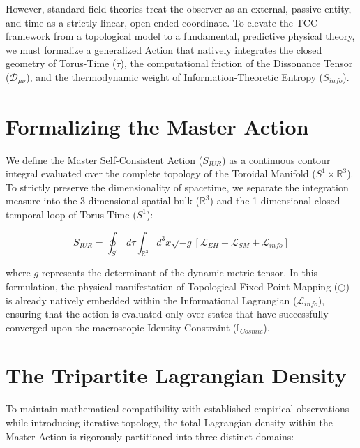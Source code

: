 \documentclass[12pt,openany]{book}
\theoremstyle{plain}
\theoremstyle{definition}
\theoremstyle{remark}
\begin{document}
However, standard field theories treat the observer as an external, passive entity, and time as a strictly linear, open-ended coordinate. To elevate the TCC framework from a topological model to a fundamental, predictive physical theory, we must formalize a generalized Action that natively integrates the closed geometry of Torus-Time ($\tilde{\tau}$), the computational friction of the Dissonance Tensor ($\mathcal{D}_{\mu\nu}$), and the thermodynamic weight of Information-Theoretic Entropy ($S_{info}$).

\section{Formalizing the Master Action}

We define the Master Self-Consistent Action ($S_{IUR}$) as a continuous contour integral evaluated over the complete topology of the Toroidal Manifold ($S^1 \times \mathbb{R}^3$). To strictly preserve the dimensionality of spacetime, we separate the integration measure into the 3-dimensional spatial bulk ($\mathbb{R}^3$) and the 1-dimensional closed temporal loop of Torus-Time ($S^1$):

$$S_{IUR} = \oint_{S^1} d\tilde{\tau} \int_{\mathbb{R}^3} d^3x \sqrt{-g} \left[ \mathcal{L}_{EH} + \mathcal{L}_{SM} + \mathcal{L}_{info} \right]$$

where $g$ represents the determinant of the dynamic metric tensor. In this formulation, the physical manifestation of Topological Fixed-Point Mapping ($\bigcirc$) is already natively embedded within the Informational Lagrangian ($\mathcal{L}_{info}$), ensuring that the action is evaluated only over states that have successfully converged upon the macroscopic Identity Constraint ($\mathbb{I}_{Cosmic}$).

\section{The Tripartite Lagrangian Density}

To maintain mathematical compatibility with established empirical observations while introducing iterative topology, the total Lagrangian density within the Master Action is rigorously partitioned into three distinct domains:
\end{document}
